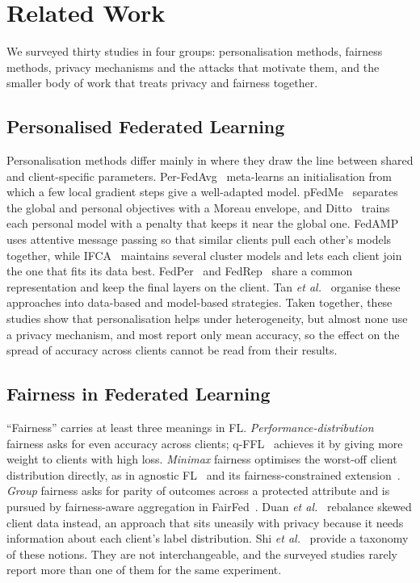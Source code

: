 \section{Related Work}\label{sec:related}
We surveyed thirty studies in four groups: personalisation methods, fairness methods, privacy mechanisms and the
attacks that motivate them, and the smaller body of work that treats privacy and fairness together.

\subsection{Personalised Federated Learning}
Personalisation methods differ mainly in where they draw the line between shared and client-specific parameters.
Per-FedAvg~\cite{fallah2020personalized} meta-learns an initialisation from which a few local gradient steps give a
well-adapted model. pFedMe~\cite{dinh2020personalized} separates the global and personal objectives with a Moreau
envelope, and Ditto~\cite{li2021ditto} trains each personal model with a penalty that keeps it near the global one.
FedAMP~\cite{huang2021personalized} uses attentive message passing so that similar clients pull each other's models
together, while IFCA~\cite{ghosh2022efficient} maintains several cluster models and lets each client join the one
that fits its data best. FedPer~\cite{arivazhagan2019federated} and FedRep~\cite{collins2021exploiting} share a
common representation and keep the final layers on the client. Tan \emph{et al.}~\cite{tan2023towards} organise
these approaches into data-based and model-based strategies. Taken together, these studies show that
personalisation helps under heterogeneity, but almost none use a privacy mechanism, and most report only mean
accuracy, so the effect on the spread of accuracy across clients cannot be read from their results.

\subsection{Fairness in Federated Learning}
``Fairness'' carries at least three meanings in FL. \emph{Performance-distribution} fairness asks for even accuracy
across clients; q-FFL~\cite{li2020fair} achieves it by giving more weight to clients with high loss.
\emph{Minimax} fairness optimises the worst-off client distribution directly, as in agnostic
FL~\cite{mohri2019agnostic} and its fairness-constrained extension~\cite{du2021fairness}. \emph{Group} fairness asks
for parity of outcomes across a protected attribute and is pursued by fairness-aware aggregation in
FairFed~\cite{ezzeldin2023fairfed}. Duan \emph{et al.}~\cite{duan2021self} rebalance skewed client data instead, an
approach that sits uneasily with privacy because it needs information about each client's label distribution. Shi
\emph{et al.}~\cite{shi2024towards} provide a taxonomy of these notions. They are not interchangeable, and the
surveyed studies rarely report more than one of them for the same experiment.

